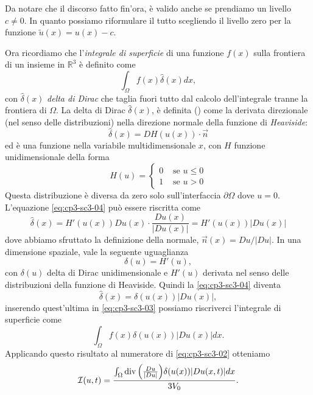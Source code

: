 \begin{osservazione}
  \label{oss:cp3-sc3-01}
Da notare che il discorso fatto fin'ora, è valido anche se prendiamo
un livello $c\ne 0$. In quanto possiamo riformulare il tutto
scegliendo il livello zero per la funzione  $\tilde{u}(x)=u(x)-c$.
\end{osservazione}
Ora ricordiamo che l'\emph{integrale di superficie} di una funzione
$f(x)$ sulla frontiera di un insieme in $\mathbb{R}^3$ è definito come \cite[vedi][§1.5]{osher:fed}
\begin{equation}
  \label{eq:cp3-sc3-03}
  \int_{\Omega}f(x)\hat{\delta}(x)dx,
\end{equation}
con $\hat{\delta}(x)$  \emph{delta di Dirac} che taglia
fuori tutto dal calcolo dell'integrale tranne la frontiera di
$\Omega$. La delta di Dirac $\hat{\delta}(x)$, è definita
(\cite[vedi][§1.5]{osher:fed}) come la
derivata direzionale (nel senso delle distribuzioni) nella direzione normale della funzione di \emph{Heaviside}:
\begin{equation}
  \label{eq:cp3-sc3-04}
  \hat{\delta}(x)=DH(u(x))\cdot\vec{n}
\end{equation}
ed è una funzione nella variabile multidimensionale $x$, con $H$
funzione unidimensionale della forma 
\[
H(u)=
\begin{cases}
  0 &\text{ se $u\leq 0$} \\
  1 &\text{ se $u>0$}
\end{cases}
\]
Questa distribuzione è diversa da zero solo sull'interfaccia $\partial\Omega$
dove $u=0$. L'equazione \eqref{eq:cp3-sc3-04} può essere riscritta come
\[
\hat{\delta}(x) = H'(u(x))Du(x)\cdot\frac{Du(x)}{|Du(x)|}=H'(u(x))|Du(x)|
\]
dove abbiamo sfruttato la definizione della normale,
$\vec{n}(x)=Du/|Du|$. In una dimensione spaziale, vale la seguente uguaglianza
\[
\delta(u)=H'(u),
\]
con $\delta(u)$ delta di Dirac unidimensionale e $H'(u)$ derivata nel
senso delle distribuzioni della funzione di Heaviside.
Quindi la \eqref{eq:cp3-sc3-04} diventa
\begin{equation}
  \label{eq:cp3-sc3-05}
  \hat{\delta}(x)=\delta(u(x))|Du(x)|,
\end{equation}
inserendo quest'ultima in \eqref{eq:cp3-sc3-03} possiamo riscriverci l'integrale di superficie come 
\begin{equation}
  \label{eq:cp3-sc3-06}
  \int_{\Omega}f(x)\delta(u(x))|Du(x)|dx.
\end{equation}
Applicando questo risultato al numeratore di \eqref{eq:cp3-sc3-02}
otteniamo
\begin{equation}
  \label{eq:cp3-sc3-07}
\mathcal{I}(u,t) = \frac{\int_{\Omega}\operatorname{div}{\left(\frac{Du}{|Du|}\right)}\delta(u(x))|Du(x,t)|dx}{3V_0}.
\end{equation}
